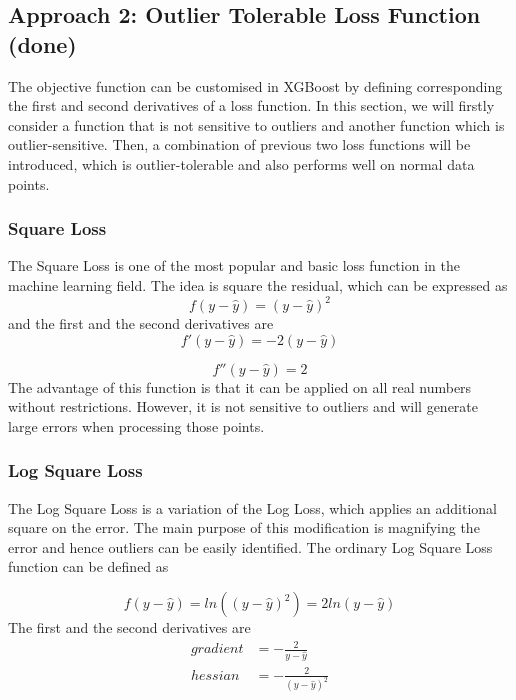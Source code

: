 \documentclass[runningheads]{llncs}
\begin{document}
\subsection{Approach 2: Outlier Tolerable Loss Function (done)}
The objective function can be customised in XGBoost by defining corresponding the first and second derivatives of a loss function. In this section, we will firstly consider a function that is not sensitive to outliers and another function which is outlier-sensitive. Then, a combination of previous two loss functions will be introduced, which is outlier-tolerable and also performs well on normal data points.
\subsubsection{Square Loss}
The Square Loss is one of the most popular and basic loss function in the machine learning field. The idea is square the residual, which can be expressed as
\[f(y-\hat{y}) = (y-\hat{y})^2\]
and the first and the second derivatives are
\begin{equation}
  f'(y - \hat{y})= -2(y-\hat{y})
\end{equation}

\begin{equation}
  f''(y - \hat{y})= 2
\end{equation}
The advantage of this function is that it can be applied on all real numbers without restrictions. However, it is not sensitive to outliers and will generate large errors when processing those points.
\subsubsection{Log Square Loss}
The Log Square Loss is a variation of the Log Loss, which applies an additional square on the error. The main purpose of this modification is magnifying the error and hence outliers can be easily identified. The ordinary Log Square Loss function can be defined as

\begin{equation}
	f(y - \hat{y}) = ln((y-\hat{y})^2) = 2ln(y-\hat{y})
\end{equation}
The first and the second derivatives are 
\begin{equation}\label{5.1.2.1}
	\begin{split}
		gradient & = -\frac{2}{y - \hat{y}} \\
		hessian & = -\frac{2}{(y - \hat{y})^2}
	\end{split}
\end{equation}
\end{document}
